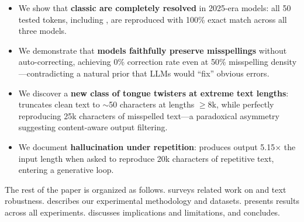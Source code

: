 \begin{itemize}[leftmargin=*,itemsep=0pt,topsep=0pt]
    \item We show that \textbf{classic \glitchtokens are completely resolved} in 2025-era models: all 50 tested tokens, including \magikarp, are reproduced with 100\% exact match across all three models.
    \item We demonstrate that \textbf{models faithfully preserve misspellings} without auto-correcting, achieving 0\% correction rate even at 50\% misspelling density---contradicting a natural prior that LLMs would ``fix'' obvious errors.
    \item We discover a \textbf{new class of tongue twisters at extreme text lengths}: \gptfull truncates clean text to $\sim$50 characters at lengths $\geq$8k, while perfectly reproducing 25k characters of misspelled text---a paradoxical asymmetry suggesting content-aware output filtering.
    \item We document \textbf{hallucination under repetition}: \gptmini produces output 5.15$\times$ the input length when asked to reproduce 20k characters of repetitive text, entering a generative loop.
\end{itemize}

The rest of the paper is organized as follows.  surveys related work on \glitchtokens and text robustness.  describes our experimental methodology and datasets.  presents results across all experiments.  discusses implications and limitations, and  concludes.
